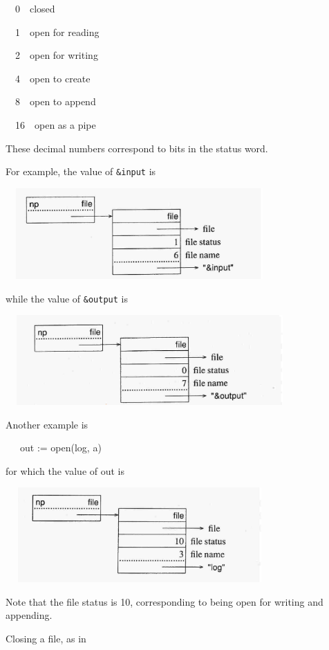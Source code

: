 \ \ 0\ \ closed

\ \ 1\ \ open for reading

\ \ 2\ \ open for writing

\ \ 4\ \ open to create

\ \ 8\ \ open to append

\ \ 16\ \ open as a pipe

\noindent These decimal numbers correspond to bits in the status word.

For example, the value of \texttt{\&input} is


\ \  \includegraphics[width=3.7402in,height=1.3661in]{ib-img/ib-img107.jpg} 

\noindent while the value of \texttt{\&output} is


\ \  \includegraphics[width=4.0602in,height=1.352in]{ib-img/ib-img108.jpg} 


Another example is

{\ttfamily\mdseries
\ \ \ out := open({\textquotedbl}log{\textquotedbl}, {\textquotedbl}a{\textquotedbl})}

\noindent for which the value of out is


\ \  \includegraphics[width=3.7402in,height=1.4252in]{ib-img/ib-img109.jpg} 

Note that the file status is 10, corresponding to being open for
writing and appending.

Closing a file, as in

